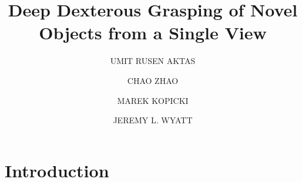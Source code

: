 \documentclass{ws-ijhr}
\begin{document}

%
\catchline{}{}{}{}{}
%

\title{Deep Dexterous Grasping of Novel Objects from a Single View}

\author{UMIT RUSEN AKTAS}

\address{University Department, University Name, Address\\
City, State ZIP/Zone,
Country\\
rusenaktas@gmail.com}

\author{CHAO ZHAO}

\address{Group, Laboratory, Address\\
City, State ZIP/Zone, Country\\
chaozh1@hotmail.com}

\author{MAREK KOPICKI}

\address{Group, Laboratory, Address\\
City, State ZIP/Zone, Country\\
marekkopicki@gmail.com}

\author{JEREMY L. WYATT}

\address{Group, Laboratory, Address\\
City, State ZIP/Zone, Country\\
jeremy.l.wyatt@gmail.com}

\maketitle

\begin{history}
\end{history}

\begin{abstract}

\end{abstract}


\section{Introduction}


\end{document}
